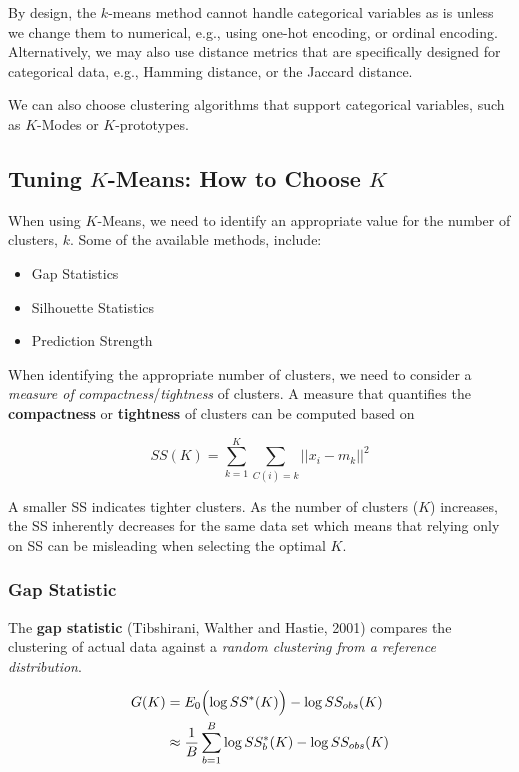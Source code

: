 \documentclass[
]{book}
\begin{document}
By design, the \(k\)-means method cannot handle categorical variables as is unless we change them to numerical, e.g., using one-hot encoding, or ordinal encoding. Alternatively, we may also use distance metrics that are specifically designed for categorical data, e.g., Hamming distance, or the Jaccard distance.

We can also choose clustering algorithms that support categorical variables, such as \(K\)-Modes or \(K\)-prototypes.

\subsection{\texorpdfstring{Tuning \(K\)-Means: How to Choose \(K\)}{Tuning K-Means: How to Choose K}}\label{tuning-k-means-how-to-choose-k}

When using \(K\)-Means, we need to identify an appropriate value for the number of clusters, \(k\). Some of the available methods, include:

\begin{itemize}
\item
  Gap Statistics
\item
  Silhouette Statistics
\item
  Prediction Strength
\end{itemize}

When identifying the appropriate number of clusters, we need to consider a \emph{measure of} \emph{compactness}/\emph{tightness} of clusters. A measure that quantifies the \textbf{compactness} or \textbf{tightness} of clusters can be computed based on

\[SS(K) = \sum_{k=1}^{K} \sum_{C(i)=k} ||x_i - m_k||^2 \]

A smaller SS indicates tighter clusters. As the number of clusters (\(K\)) increases, the SS inherently decreases for the same data set which means that relying only on SS can be misleading when selecting the optimal \(K\).

\subsubsection*{Gap Statistic}\label{gap-statistic}

The \textbf{gap statistic} (Tibshirani, Walther and Hastie, 2001) compares the clustering of actual data against a \emph{random clustering from a reference distribution}.

\begin{align*}
G(K) &= E_0\Bigl( \log SS^*(K) \Bigr) - \log SS_{obs}(K)\\
&\approx \frac{1}{B} \sum_{b=1}^{B} \log SS_b^*(K) - \log SS_{obs}(K)
\end{align*}
\end{document}
